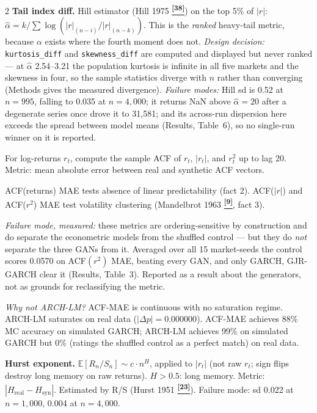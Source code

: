 \documentclass[10pt]{article}
\newcommand{\navybox}[2]{\begin{tcolorbox}[mybox={Navy}{LBg},title={#1}]#2\end{tcolorbox}}
\newcommand{\purplebox}[2]{\begin{tcolorbox}[mybox={Purple}{LBg},title={#1}]#2\end{tcolorbox}}
\newcommand{\tcite}[1]{%
  \hyperlink{R:#1}{\textsuperscript{\scriptsize\textbf{[#1]}}}}
\newcommand{\E}{\mathbb{E}}
\begin{document}
\begin{multicols}{2}
{\smallskip
\textbf{Tail index diff.} Hill estimator (Hill 1975\tcite{38}) on the top 5\% of $|r|$: $\hat{\alpha} = k/\sum \log(|r|_{(n-i)}/|r|_{(n-k)})$. This is the \emph{ranked} heavy-tail metric, because $\alpha$ exists where the fourth moment does not. \textit{Design decision:} \texttt{kurtosis\_diff} and \texttt{skewness\_diff} are computed and displayed but never ranked --- at $\hat\alpha$ 2.54--3.21 the population kurtosis is infinite in all five markets and the skewness in four, so the sample statistics diverge with $n$ rather than converging (Methods gives the measured divergence). \textit{Failure modes:} Hill sd is 0.52 at $n=995$, falling to 0.035 at $n=4{,}000$; it returns NaN above $\hat\alpha=20$ after a degenerate series once drove it to 31{,}581; and its across-run dispersion here exceeds the spread between model means (Results, Table~6), so no single-run winner on it is reported.}

\columnbreak

\purplebox{Temporal Group: ACF-MAE Triple}{%
For log-returns $r_t$, compute the sample ACF of $r_t$, $|r_t|$, and $r_t^2$ up to lag 20. Metric: mean absolute error between real and synthetic ACF vectors.

ACF(returns) MAE tests absence of linear predictability (fact 2). ACF($|r|$) and ACF($r^2$) MAE test volatility clustering (Mandelbrot 1963\tcite{9}, fact 3).

\textit{Failure mode, measured:} these metrics are ordering-sensitive by construction and do separate the econometric models from the shuffled control --- but they do \emph{not} separate the three GANs from it. Averaged over all 15 market-seeds the control scores 0.0570 on ACF$(r^2)$ MAE, beating every GAN, and only GARCH, GJR-GARCH clear it (Results, Table~3). Reported as a result about the generators, not as grounds for reclassifying the metric.

\textit{Why not ARCH-LM?} ACF-MAE is continuous with no saturation regime. ARCH-LM saturates on real data ($|\Delta p| = 0.000000$). ACF-MAE achieves 88\% MC accuracy on simulated GARCH; ARCH-LM achieves 99\% on simulated GARCH but 0\% (ratings the shuffled control as a perfect match) on real data.}

\navybox{Temporal Group: Hurst and Residual Kurtosis}{%
\textbf{Hurst exponent.} $\E[R_n/S_n] \sim c\cdot n^H$, applied to $|r_t|$ (not raw $r_t$; sign flips destroy long memory on raw returns). $H>0.5$: long memory. Metric: $|H_\text{real} - H_\text{syn}|$. Estimated by R/S (Hurst 1951\tcite{23}). Failure mode: sd 0.022 at $n=1{,}000$, 0.004 at $n=4{,}000$.

}
\end{multicols}
\end{document}
